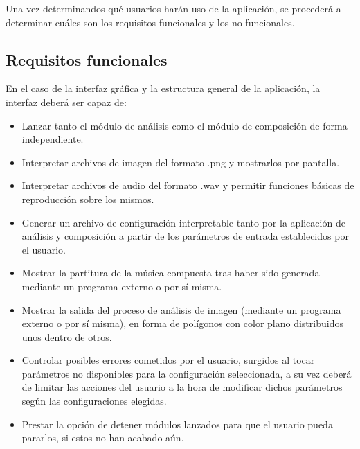 	Una vez determinandos qué usuarios harán uso de la aplicación, se procederá a determinar cuáles son los requisitos funcionales y los no funcionales.
	
	\subsection{Requisitos funcionales}
	
	En el caso de la interfaz gráfica y la estructura general de la aplicación, la interfaz deberá ser capaz de:
	
	 \begin{itemize}
		 \item Lanzar tanto el módulo de análisis como el módulo de composición de forma independiente.
		 \item Interpretar archivos de imagen del formato .png y mostrarlos por pantalla.
		 \item Interpretar archivos de audio del formato .wav y permitir funciones básicas de reproducción sobre los mismos.
		 \item Generar un archivo de configuración interpretable tanto por la aplicación de análisis y composición a partir de los parámetros de entrada establecidos por el usuario.
		 \item Mostrar la partitura de la música compuesta tras haber sido generada mediante un programa externo o por sí misma.
		 \item Mostrar la salida del proceso de análisis de imagen (mediante un programa externo o por sí misma), en forma de polígonos con color plano distribuidos unos dentro de otros.
		 \item Controlar posibles errores cometidos por el usuario, surgidos al tocar parámetros no disponibles para la configuración seleccionada, a su vez deberá de limitar las acciones del usuario a la hora de modificar dichos parámetros según las configuraciones elegidas.
		 \item Prestar la opción de detener módulos lanzados para que el usuario pueda pararlos, si estos no han acabado aún.
	 \end{itemize}
	 
